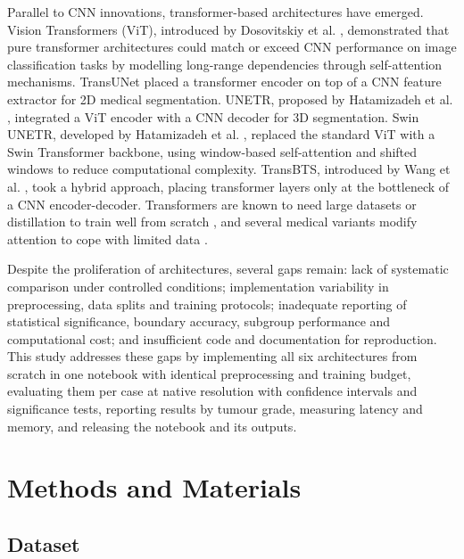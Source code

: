 \documentclass[final,3p,times,number]{elsarticle}
\begin{document}
Parallel to CNN innovations, transformer-based architectures have emerged. Vision Transformers (ViT), introduced by Dosovitskiy et al. \cite{ref8}, demonstrated that pure transformer architectures could match or exceed CNN performance on image classification tasks by modelling long-range dependencies through self-attention mechanisms. TransUNet \cite{ref10} placed a transformer encoder on top of a CNN feature extractor for 2D medical segmentation. UNETR, proposed by Hatamizadeh et al. \cite{ref14}, integrated a ViT encoder with a CNN decoder for 3D segmentation. Swin UNETR, developed by Hatamizadeh et al. \cite{ref15}, replaced the standard ViT with a Swin Transformer backbone, using window-based self-attention and shifted windows to reduce computational complexity. TransBTS, introduced by Wang et al. \cite{ref9}, took a hybrid approach, placing transformer layers only at the bottleneck of a CNN encoder-decoder. Transformers are known to need large datasets or distillation to train well from scratch \cite{ref13}, and several medical variants modify attention to cope with limited data \cite{ref11,ref12}.

Despite the proliferation of architectures, several gaps remain: lack of systematic comparison under controlled conditions; implementation variability in preprocessing, data splits and training protocols; inadequate reporting of statistical significance, boundary accuracy, subgroup performance and computational cost; and insufficient code and documentation for reproduction. This study addresses these gaps by implementing all six architectures from scratch in one notebook with identical preprocessing and training budget, evaluating them per case at native resolution with confidence intervals and significance tests, reporting results by tumour grade, measuring latency and memory, and releasing the notebook and its outputs.

\section{Methods and Materials}

\subsection{Dataset}
\end{document}
